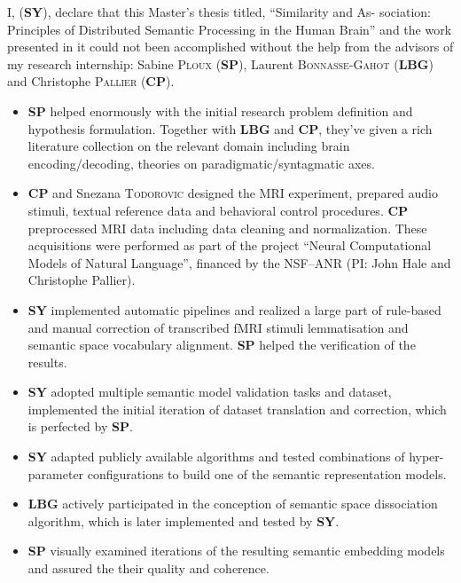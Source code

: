 \begin{declarationcontribution}
    \addchaptertocentry{\contributionname} %
    \noindent I, \authorname (\textbf{SY}), declare that this Master's thesis titled, \enquote{Similarity and As- sociation: Principles of Distributed Semantic Processing in the Human Brain} and the work presented in it could not been accomplished without the help from the advisors of my research internship: Sabine \textsc{Ploux} (\textbf{SP}), Laurent \textsc{Bonnasse-Gahot} (\textbf{LBG}) and Christophe \textsc{Pallier} (\textbf{CP}).
    
    \begin{itemize} 
    \item \textbf{SP} helped enormously with the initial research problem definition and hypothesis formulation. Together with \textbf{LBG} and \textbf{CP}, they've given a rich literature collection on the relevant domain including brain encoding/decoding, theories on paradigmatic/syntagmatic axes.
    \item \textbf{CP} and Snezana \textsc{Todorovic} designed the MRI experiment, prepared audio stimuli, textual reference data and behavioral control procedures. \textbf{CP} preprocessed MRI data including data cleaning and normalization. These acquisitions were performed as part of the project ``Neural Computational Models of Natural Language'', financed by the NSF--ANR (PI: John Hale and Christophe Pallier).
    \item \textbf{SY} implemented automatic pipelines and realized a large part of rule-based and manual correction of transcribed fMRI stimuli lemmatisation and semantic space vocabulary alignment. \textbf{SP} helped the verification of the results.
    \item \textbf{SY} adopted multiple semantic model validation tasks and dataset, implemented the initial iteration of dataset translation and correction, which is perfected by \textbf{SP}.
    \item \textbf{SY} adapted publicly available algorithms and tested combinations of hyper-parameter configurations to build one of the semantic representation models.
    \item \textbf{LBG} actively participated in the conception of semantic space dissociation algorithm, which is later implemented and tested by \textbf{SY}. 
    \item \textbf{SP} visually examined iterations of the resulting semantic embedding models and assured the their quality and coherence.

\end{itemize}
\end{declarationcontribution}
